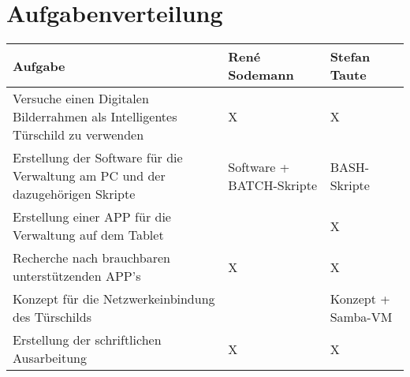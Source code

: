 
\chapter*{Aufgabenverteilung}

\begin{center}
\begin{tabular}[t]{|>{\centering\arraybackslash}p{}|>{\centering\arraybackslash}p{}|>{\centering\arraybackslash}p{}|}
\hline
Aufgabe & René Sodemann & Stefan Taute\\
\hline
Versuche einen Digitalen Bilderrahmen als Intelligentes Türschild zu verwenden & X & X\\
\hline
Erstellung der Software für die Verwaltung am PC und der dazugehörigen Skripte & Software + BATCH-Skripte & BASH-Skripte\\
\hline
Erstellung einer APP für die Verwaltung auf dem Tablet &  & X\\
\hline
Recherche nach brauchbaren unterstützenden APP's & X & X\\
\hline
Konzept für die Netzwerkeinbindung des Türschilds &  & Konzept + Samba-VM\\
\hline
Erstellung der schriftlichen Ausarbeitung & X & X\\
\hline
\end{tabular}
\end{center}

